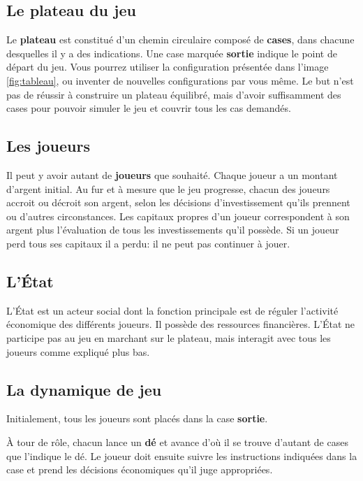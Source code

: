 \documentclass[12pt]{article}
\begin{document}
    \subsection{Le plateau du jeu}
    Le \textbf{plateau} est constitué d'un chemin circulaire composé de \textbf{cases},
dans chacune desquelles il y a des indications. Une case marquée \textbf{sortie}
indique le point de départ du jeu.
Vous pourrez utiliser la configuration présentée dans l'image \autoref{fig:tableau}, ou inventer de nouvelles configurations par vous même. 
Le but n'est pas de réussir à construire un plateau équilibré, mais d'avoir suffisamment des cases pour pouvoir simuler le jeu et couvrir tous les cas demandés.
	
    \subsection{Les joueurs}
   
    Il peut y avoir autant de \textbf{joueurs} que souhaité. Chaque joueur a un
montant d'argent initial. Au fur et à mesure que le jeu progresse, chacun des joueurs accroit
ou décroit son argent, selon les décisions d'investissement qu'ils prennent ou d'autres
circonstances. Les capitaux propres d'un joueur correspondent à
son argent plus l'évaluation de tous les investissements qu'il possède.
Si un joueur perd tous ses capitaux il a perdu: il ne peut pas continuer à jouer.
    
    \subsection{L'\'Etat}
    
    L'\'Etat est un acteur social dont la fonction principale est de réguler l'activité économique des
différents joueurs. Il possède des ressources financières. L'État ne participe pas
au jeu en marchant sur le plateau, mais interagit avec tous les joueurs comme expliqué plus bas.

    \subsection{La dynamique de jeu}
    
    Initialement, tous les joueurs sont placés dans la case \textbf{sortie}. 

À tour de rôle, chacun lance un \textbf{dé} et avance d'où il se trouve d'autant de cases que l'indique le dé. 
Le joueur doit ensuite suivre les instructions indiquées dans la case et prend les décisions économiques qu'il juge appropriées.
    
\end{document}

